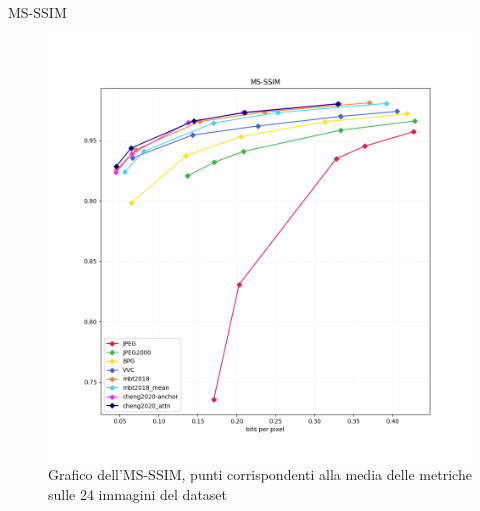     \begin{frame}{MS-SSIM}
        \begin{figure}[t!]
            \centering
            \includegraphics[width=0.57\textheight]{Immagini/METRICS/MS-SSIM.png}
            \caption{Grafico dell'MS-SSIM\footnotemark[1], punti corrispondenti alla media delle metriche sulle 24 immagini del dataset}
            \label{fig:GraphMS-SSIM}
        \end{figure}
    \end{frame}

